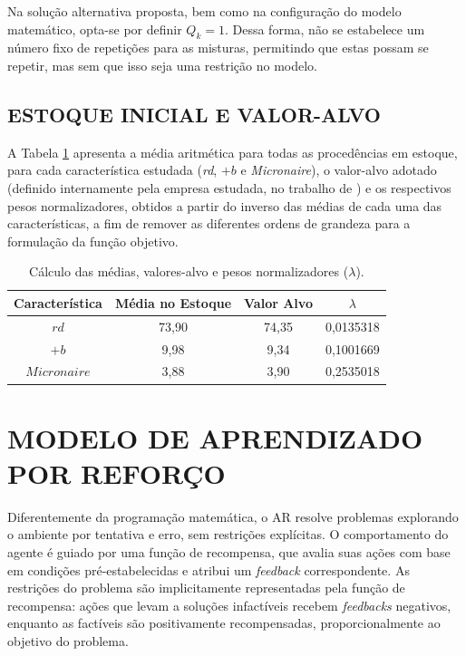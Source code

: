 \documentclass[
    12pt,                %
    openright,           %
    oneside,             %
    a4paper,             %
    english,             %
    spanish,             %
    brazil               %
]{ufscar}
\begin{document}
Na solução alternativa proposta, bem como na configuração do modelo matemático, opta-se por definir \( Q_k = 1 \). Dessa forma, não se estabelece um número fixo de repetições para as misturas, permitindo que estas possam se repetir, mas sem que isso seja uma restrição no modelo.

\section{ESTOQUE INICIAL E VALOR-ALVO}

A Tabela \ref{tab:valores_lambda} apresenta a média aritmética para todas as procedências em estoque, para cada característica estudada (\textit{rd}, \textit{\(+b\)} e \textit{Micronaire}), o valor-alvo adotado (definido internamente pela empresa estudada, no trabalho de ) e os respectivos pesos normalizadores, obtidos a partir do inverso das médias de cada uma das características, a fim de remover as diferentes ordens de grandeza para a formulação da função objetivo. 

\begin{table}[htp]
    \centering
    \caption{Cálculo das médias, valores-alvo e pesos normalizadores (\(\lambda\)).}
    \begin{tabular}{c c c c}
         Característica & Média no Estoque & Valor Alvo & \(\lambda\) \\
         \hline
         \(rd\)         & 73,90  & 74,35  & 0,0135318 \\ 
         \(+b\)         & 9,98   & 9,34   & 0,1001669 \\ 
         \(Micronaire\) & 3,88   & 3,90   & 0,2535018 \\ 
         \hline
    \end{tabular}
    \label{tab:valores_lambda}
\end{table}

\chapter{MODELO DE APRENDIZADO POR REFORÇO}

Diferentemente da programação matemática, o AR resolve problemas explorando o ambiente por tentativa e erro, sem restrições explícitas. O comportamento do agente é guiado por uma função de recompensa, que avalia suas ações com base em condições pré-estabelecidas e atribui um \textit{feedback} correspondente. As restrições do problema são implicitamente representadas pela função de recompensa: ações que levam a soluções infactíveis recebem \textit{feedbacks} negativos, enquanto as factíveis são positivamente recompensadas, proporcionalmente ao objetivo do problema.
\end{document}
